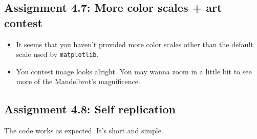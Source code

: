 \documentclass[a4paper]{article}
\begin{document}
\subsection*{Assignment 4.7: More color scales + art contest}
\begin{itemize}
  \item It seems that you haven't provided more color scales other than the default scale used by \texttt{matplotlib}.
  \item You contest image looks alright. You may wanna zoom in a little bit to see more of the Mandelbrot's magnificence. 
\end{itemize}

\subsection*{Assignment 4.8: Self replication}
The code works as expected. It's short and simple.



\end{document}
